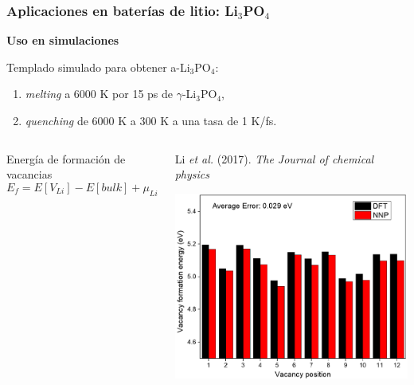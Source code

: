\documentclass[aspectratio=169]{beamer}
\let\oldtextbf\textbf
\renewcommand{\textbf}[1]{\textcolor{nordblue}{\oldtextbf{#1}}}
\begin{document}
    \begin{frame}
        \frametitle{Aplicaciones en baterías de litio: Li$_3$PO$_4$}
         
        \textbf{Uso en simulaciones}

        Templado simulado para obtener a-Li$_3$PO$_4$:
        \begin{enumerate}
            \item \textit{melting} a 6000 K por 15 ps de $\gamma$-Li$_3$PO$_4$, 
            \item \textit{quenching} de 6000 K a 300 K a una tasa de 1 K/fs.
        \end{enumerate}

        \pause

        \begin{columns}
            Energía de formación de vacancias
            $$
            E_f = E[V_{Li}] - E[bulk] + \mu_{Li}
            $$

            \pause 

            \begin{center}
                \tiny{Li \textit{et al.} (2017). \textit{The Journal of chemical
                physics}}

                \includegraphics[width=0.8\columnwidth]{Li3PO4-vacancias.png}
            \end{center}
        \end{columns}

    \end{frame}
    
\end{document}
